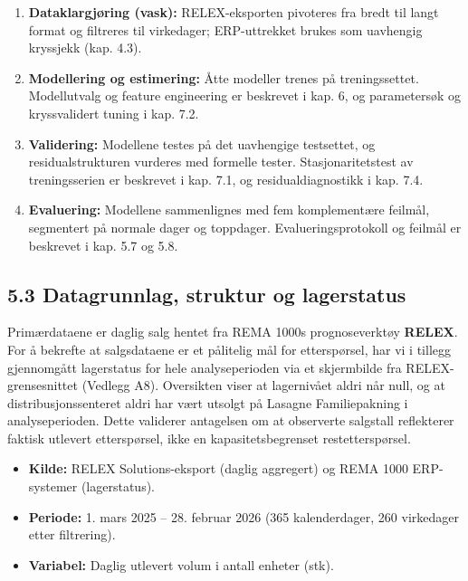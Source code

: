 \documentclass[
  norsk,
  11pt,
  a4paper,
]{article}
\providecommand{\tightlist}{%
  \setlength{\itemsep}{0pt}\setlength{\parskip}{0pt}}
\begin{document}
\begin{enumerate}
\def\labelenumi{\arabic{enumi}.}
\tightlist
\item
  \textbf{Dataklargjøring (vask):} RELEX-eksporten pivoteres fra bredt
  til langt format og filtreres til virkedager; ERP-uttrekket brukes som
  uavhengig kryssjekk (kap. 4.3).
\item
  \textbf{Modellering og estimering:} Åtte modeller trenes på
  treningssettet. Modellutvalg og feature engineering er beskrevet i
  kap. 6, og parametersøk og kryssvalidert tuning i kap. 7.2.
\item
  \textbf{Validering:} Modellene testes på det uavhengige testsettet, og
  residualstrukturen vurderes med formelle tester. Stasjonaritetstest av
  treningsserien er beskrevet i kap. 7.1, og residualdiagnostikk i kap.
  7.4.
\item
  \textbf{Evaluering:} Modellene sammenlignes med fem komplementære
  feilmål, segmentert på normale dager og toppdager.
  Evalueringsprotokoll og feilmål er beskrevet i kap. 5.7 og 5.8.
\end{enumerate}

\subsection{5.3 Datagrunnlag, struktur og
lagerstatus}\label{datagrunnlag-struktur-og-lagerstatus}

Primærdataene er daglig salg hentet fra REMA 1000s prognoseverktøy
\textbf{RELEX}. For å bekrefte at salgsdataene er et pålitelig mål for
etterspørsel, har vi i tillegg gjennomgått lagerstatus for hele
analyseperioden via et skjermbilde fra RELEX-grensesnittet (Vedlegg A8).
Oversikten viser at lagernivået aldri når null, og at
distribusjonssenteret aldri har vært utsolgt på Lasagne Familiepakning i
analyseperioden. Dette validerer antagelsen om at observerte salgstall
reflekterer faktisk utlevert etterspørsel, ikke en kapasitetsbegrenset
restetterspørsel.

\begin{itemize}
\tightlist
\item
  \textbf{Kilde:} RELEX Solutions-eksport (daglig aggregert) og REMA
  1000 ERP-systemer (lagerstatus).
\item
  \textbf{Periode:} 1. mars 2025 -- 28. februar 2026 (365 kalenderdager,
  260 virkedager etter filtrering).
\item
  \textbf{Variabel:} Daglig utlevert volum i antall enheter (stk).
\end{itemize}
\end{document}
